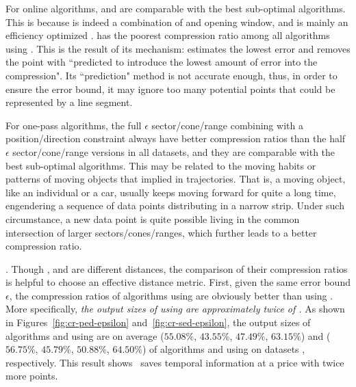 For online algorithms, \bqsa and \opwa are comparable with the best sub-optimal algorithms. This is because \opwa is indeed a combination of \dpa and opening window, and \bqsa is mainly an efficiency optimized \opwa.
\squishe has the poorest compression ratio among all algorithms using \sed. This is the result of its mechanism: \squishe estimates the lowest \sed error and removes the point with ``predicted to introduce the lowest amount of error into the compression"\cite{Muckell:SQUISH}. Its ``prediction" method is not accurate enough, thus, in order to ensure the error bound, it may ignore too many potential points that could be represented by a line segment.

For one-pass algorithms, the full $\epsilon$ sector/cone/range combining with a position/direction constraint always have better compression ratios than the half $\epsilon$ sector/cone/range versions in all datasets, and they are comparable with the best sub-optimal algorithms.
This may be related to the moving habits or patterns of moving objects that implied in trajectories.
That is, a moving object, like an individual or a car, usually keeps moving forward for quite a long time, engendering a sequence of data points distributing in a narrow strip. Under such circumstance, a new data point is quite possible living in the common intersection of larger sectors/cones/ranges, which further leads to a better compression ratio.




.
Though \ped, \sed and \dad are different distances, the comparison of their compression ratios is helpful to choose an effective distance metric.
%
First, given the same error bound $\epsilon$, the compression ratios of algorithms using \ped are obviously better
than using \sed. More specifically, \emph{the output sizes of using \sed are approximately twice of \ped.}
%
As shown in Figures~\ref{fig:cr-ped-epsilon} and~\ref{fig:cr-sed-epsilon}, the output sizes of algorithms \tpa and \dpa
using \ped are on average ($55.08\%$, $43.55\%$, $47.49\%$, $63.15\%$) and ($56.75\%$, $45.79\%$,
$50.88\%$, $64.50\%$) of algorithms \tpa and \dpa using \sed on datasets \dSets, respectively.
%
%
This result shows ~\sed saves temporal information at a price with twice more points.


